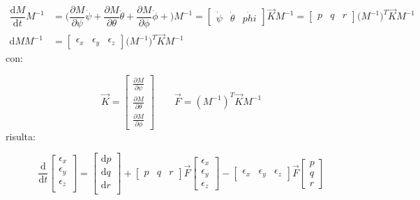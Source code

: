 \documentclass[11pt]{report}
\theoremstyle{plain}
\theoremstyle{definition}
\theoremstyle{remark}
\begin{document}
\begin{displaymath}\begin{split}
\dfrac{\textrm{d}M}{\textrm{d}t} M^{-1} &= \Bigr(
\dfrac{\partial M}{\partial \psi}\dot{\psi} + 
\dfrac{\partial M}{\partial \theta}\dot{\theta} +
\dfrac{\partial M}{\partial \phi}\dot{\phi} +
\Bigr) M^{-1} = \left[ \begin{array}{ccc}  \dot{\psi} & \dot{\theta} & \dot{phi} \end{array} \right] \vec{K} M^{-1} = \left[ \begin{array}{ccc}  p & q & r \end{array} 
\right] \bigr( M^{-1} \bigr)^{T} \vec{K} M^{-1} 
\\
\textrm{d}M M^{-1} &=  \left[ \begin{array}{ccc}  \epsilon_{x} & \epsilon_{y} & \epsilon_{z} \end{array} \right] \bigr( M^{-1} \bigr)^{T} \vec{K} M^{-1} 
\end{split}\end{displaymath}
con:

\begin{displaymath} 
\vec{K} =  \left[ \begin{array}{c}  \frac{\partial M}{\partial \psi} \\ \frac{\partial M}{\partial \theta} \\ \frac{\partial M}{\partial \phi} \end{array} \right]  
\qquad \vec{F} = (M^{-1})^{T} \vec{K} M^{-1}
\end{displaymath}
risulta:

\begin{displaymath}
\dfrac{\textrm{d}}{\textrm{d}t}
\left[ \begin{array}{c} \epsilon _{x} \\ \epsilon _{y} \\ \epsilon _{z} \\ \end{array} \right] =
\left[ \begin{array}{c} \textrm{d}p \\ \textrm{d}q \\ \textrm{d}r \\ \end{array} \right] +  \left[ \begin{array}{ccc}  p & q & r \end{array} \right] \vec{F} \left[ \begin{array}{c}  \epsilon_{x} \\ \epsilon_{y} \\ \epsilon_{z} \end{array} \right]
-
\left[ \begin{array}{ccc}  \epsilon_{x} & \epsilon_{y} & \epsilon_{z} \end{array}\right] \vec{F}
\left[ \begin{array}{c}  p \\ q \\ r \end{array}\right]
\end{displaymath}
 
\end{document}
